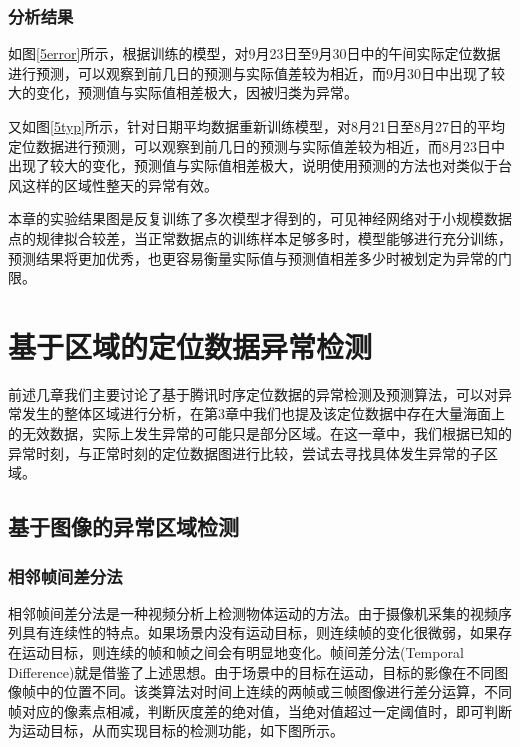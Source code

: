 \documentclass[a4paper,AutoFakeBold,oneside,12pt]{book}
\begin{document}
\subsection{分析结果}
	如图\ref{5error}所示，根据训练的模型，对9月23日至9月30日中的午间实际定位数据进行预测，可以观察到前几日的预测与实际值差较为相近，而9月30日中出现了较大的变化，预测值与实际值相差极大，因被归类为异常。


	又如图\ref{5typ}所示，针对日期平均数据重新训练模型，对8月21日至8月27日的平均定位数据进行预测，可以观察到前几日的预测与实际值差较为相近，而8月23日中出现了较大的变化，预测值与实际值相差极大，说明使用预测的方法也对类似于台风这样的区域性整天的异常有效。


	本章的实验结果图是反复训练了多次模型才得到的，可见神经网络对于小规模数据点的规律拟合较差，当正常数据点的训练样本足够多时，模型能够进行充分训练，预测结果将更加优秀，也更容易衡量实际值与预测值相差多少时被划定为异常的门限。

\chapter{基于区域的定位数据异常检测}
	前述几章我们主要讨论了基于腾讯时序定位数据的异常检测及预测算法，可以对异常发生的整体区域进行分析，在第3章中我们也提及该定位数据中存在大量海面上的无效数据，实际上发生异常的可能只是部分区域。在这一章中，我们根据已知的异常时刻，与正常时刻的定位数据图进行比较，尝试去寻找具体发生异常的子区域。

\section{基于图像的异常区域检测}
\subsection{相邻帧间差分法}
	相邻帧间差分法是一种视频分析上检测物体运动的方法。由于摄像机采集的视频序列具有连续性的特点。如果场景内没有运动目标，则连续帧的变化很微弱，如果存在运动目标，则连续的帧和帧之间会有明显地变化。帧间差分法(Temporal Difference)就是借鉴了上述思想。由于场景中的目标在运动，目标的影像在不同图像帧中的位置不同。该类算法对时间上连续的两帧或三帧图像进行差分运算，不同帧对应的像素点相减，判断灰度差的绝对值，当绝对值超过一定阈值时，即可判断为运动目标，从而实现目标的检测功能，如下图所示。
\end{document}
